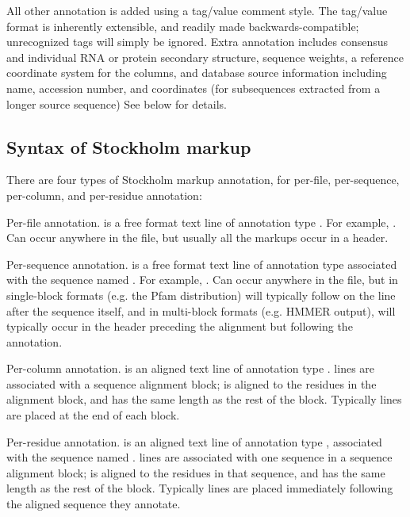 All other annotation is added using a tag/value comment style. The
tag/value format is inherently extensible, and readily made
backwards-compatible; unrecognized tags will simply be ignored. Extra
annotation includes consensus and individual RNA or protein secondary
structure, sequence weights, a reference coordinate system for the
columns, and database source information including name, accession
number, and coordinates (for subsequences extracted from a longer
source sequence) See below for details.

\subsection{Syntax of Stockholm markup}

There are four types of Stockholm markup annotation, for per-file,
per-sequence, per-column, and per-residue annotation:

\begin{sreitems}{}
\item [\emcode{\#=GF <tag> <s>}]
	Per-file annotation.  is a free format text line
	of annotation type . For example, . Can occur anywhere in the file, but usually
	all the  markups occur in a header.

\item [\emcode{\#=GS <seqname> <tag> <s>}]
	Per-sequence annotation.  is a free format text line
	of annotation type  associated with the sequence
	named . For example, . Can occur anywhere
	in the file, but in single-block formats (e.g. the Pfam
	distribution) will typically follow on the line after the
	sequence itself, and in multi-block formats (e.g. HMMER
	output), will typically occur in the header preceding the
	alignment but following the  annotation.

\item [\emcode{\#=GC <tag> <..s..>}]
	Per-column annotation.  is an aligned text line
	of annotation type .
         lines are
	associated with a sequence alignment block; 
	is aligned to the residues in the alignment block, and has
	the same length as the rest of the block.
	Typically  lines are placed at the end of each block.

\item [\emcode{\#=GR <seqname> <tag> <..s..>}]
	Per-residue annotation.  is an aligned text line
	of annotation type , associated with the sequence
	named . 
	 lines are 
	associated with one sequence in a sequence alignment block; 
	is aligned to the residues in that sequence, and has
	the same length as the rest of the block.
	Typically
         lines are placed immediately following the
	aligned	sequence they annotate.
\end{sreitems}

